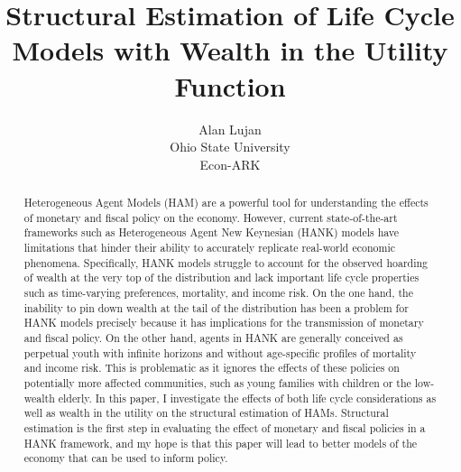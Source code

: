 \documentclass{article}
\title{Structural Estimation of Life Cycle Models with Wealth in the Utility Function}
\date{\displaydate{articleDate}}
\author{Alan Lujan\footnotemark[1]\\
Ohio State University\\Econ-ARK\\}
\begin{document}
\maketitle
{}

\begin{abstract}
Heterogeneous Agent Models (HAM) are a powerful tool for understanding the effects of monetary and fiscal policy on the economy. However, current state-of-the-art frameworks such as Heterogeneous Agent New Keynesian (HANK) models have limitations that hinder their ability to accurately replicate real-world economic phenomena. Specifically, HANK models struggle to account for the observed hoarding of wealth at the very top of the distribution and lack important life cycle properties such as time-varying preferences, mortality, and income risk. On the one hand, the inability to pin down wealth at the tail of the distribution has been a problem for HANK models precisely because it has implications for the transmission of monetary and fiscal policy. On the other hand, agents in HANK are generally conceived as perpetual youth with infinite horizons and without age-specific profiles of mortality and income risk. This is problematic as it ignores the effects of these policies on potentially more affected communities, such as young families with children or the low-wealth elderly. In this paper, I investigate the effects of both life cycle considerations as well as wealth in the utility on the structural estimation of HAMs. Structural estimation is the first step in evaluating the effect of monetary and fiscal policies in a HANK framework, and my hope is that this paper will lead to better models of the economy that can be used to inform policy.
\end{abstract}

\end{document}
